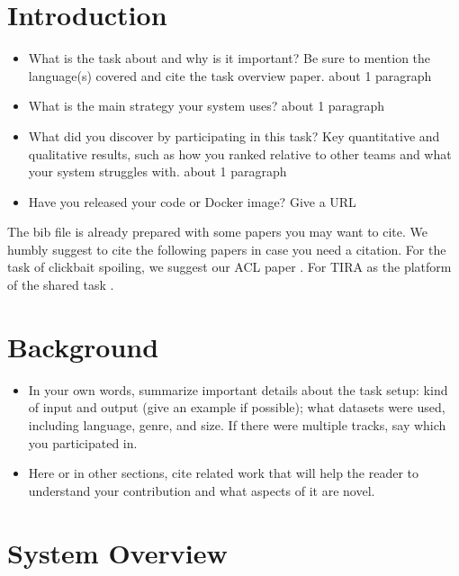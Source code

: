 \documentclass[11pt]{article}
\begin{document}
\section{Introduction}

\begin{itemize}
\item What is the task about and why is it important? Be sure to mention the language(s) covered and cite the task overview paper. about 1 paragraph

\item What is the main strategy your system uses? about 1 paragraph

\item What did you discover by participating in this task? Key quantitative and qualitative results, such as how you ranked relative to other teams and what your system struggles with. about 1 paragraph

\item Have you released your code or Docker image? Give a URL

\end{itemize}

The bib file is already prepared with some papers you may want to cite. We humbly suggest to cite the following papers in case you need a citation.
For the task of clickbait spoiling, we suggest our ACL paper \cite{hagen:2022}.
For TIRA as the platform of the shared task \cite{froebe:2023b}.

\section{Background}

\begin{itemize}
	\item In your own words, summarize important details about the task setup: kind of input and output (give an example if possible); what datasets were used, including language, genre, and size. If there were multiple tracks, say which you participated in.
	
	\item Here or in other sections, cite related work that will help the reader to understand your contribution and what aspects of it are novel.
	
\end{itemize}
\section{System Overview}
\end{document}
